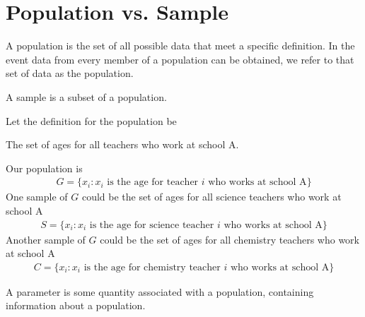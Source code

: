 \section{Population vs. Sample}

\begin{definition}
A population is the set of all possible data that meet a specific definition. In the event data from every member of a population can be obtained, we refer to that set of data as the population.
\end{definition}

\begin{definition}
A sample is a subset of a population.  
\end{definition}

\begin{example}
Let the definition for the population be
\begin{center}
    The set of ages for all teachers who work at school A.
\end{center}
Our population is 
\begin{align*}
    G = \{x_{i}: x_{i} \hspace{4pt} \text{is the age for teacher} \hspace{4pt} i \hspace{4pt} \text{who works at school A}\}
\end{align*}
One sample of $G$ could be the set of ages for all science teachers who work at school A
\begin{align*}
    S = \{x_{i}: x_{i} \hspace{4pt} \text{is the age for science teacher} \hspace{4pt} i \hspace{4pt} \text{who works at school A}\}
\end{align*}
Another sample of $G$ could be the set of ages for all chemistry teachers who work at school A
\begin{align*}
    C = \{x_{i}: x_{i} \hspace{4pt} \text{is the age for chemistry teacher} \hspace{4pt} i \hspace{4pt} \text{who works at school A}\}
\end{align*}
\end{example}

\begin{definition}
A parameter is some quantity associated with a population, containing information about a population.
\end{definition}

